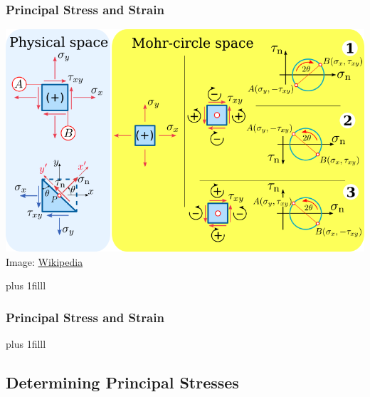 \documentclass[fleqn]{beamer} %
\newcommand{\sectionIIIsubsectionIItitle}{Principal Stress and Strain}
\newcommand{\sectionIIIsubsectionIIItitle}{Determining Principal Stresses}
\newcommand{\btVFill}{\vskip0pt plus 1filll}
\begin{document}
			\begin{frame}
				\frametitle{\sectionIIIsubsectionIItitle}

				\bigskip
			
				\includegraphics[scale=.45]{images/mohrs_circle.png}\\
				{\tiny Image: \href{https://en.wikipedia.org/wiki/Mohr\%27s_circle}{Wikipedia}}
			
				\btVFill

			\end{frame}

			\begin{frame}
				\frametitle{\sectionIIIsubsectionIItitle}

				\bigskip

				

				\btVFill
				
			\end{frame}

		\subsection{\sectionIIIsubsectionIIItitle}\label{sectionIIIsubsectionIII}	
\end{document}
